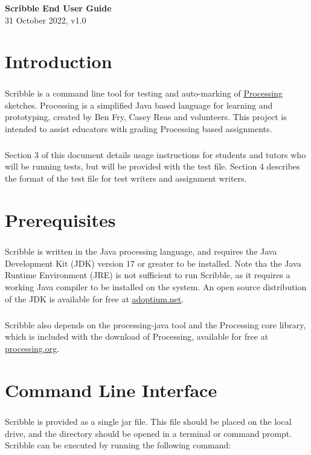 \documentclass[11pt, a4paper, onecolumn, portrait]{article}
\begin{document}
\begin{center}
\textbf{\Large{Scribble End User Guide}}~\\
{31 October 2022, v1.0}~\\
\end{center}


\section {Introduction}

\subparagraph{}
Scribble is a command line tool for testing and auto-marking of \href{https://processing.org/}{\underline{Processing}} sketches. Processing is a simplified Java based language for learning and prototyping, created by Ben Fry, Casey Reas and volunteers. This project is intended to assist educators with grading Processing based assignments.

\subparagraph{}
Section 3 of this document details usage instructions for students and tutors who will be running tests, but will be provided with the test file. Section 4 describes the format of the test file for test writers and assignment writers. 

\section{Prerequisites}

\subparagraph{}
Scribble is written in the Java processing language, and requires the Java Development Kit (JDK) version 17 or greater to be installed. Note tha the Java Runtime Environment (JRE) is not sufficient to run Scribble, as it requires a working Java compiler to be installed on the system. An open source distribution of the JDK is available for free at \href{https://adoptium.net/en-GB/temurin/releases}{\underline{adoptium.net}}.

\subparagraph{}
Scribble also depends on the processing-java tool and the Processing core library, which is included with the download of Processing, available for free at \href{https://processing.org/download}{\underline{processing.org}}.

\section{Command Line Interface}

\subparagraph{}
Scribble is provided as a single jar file. This file should be placed on the local drive, and the directory should be opened in a terminal or command prompt. Scribble can be executed by running the following command:
\end{document}
